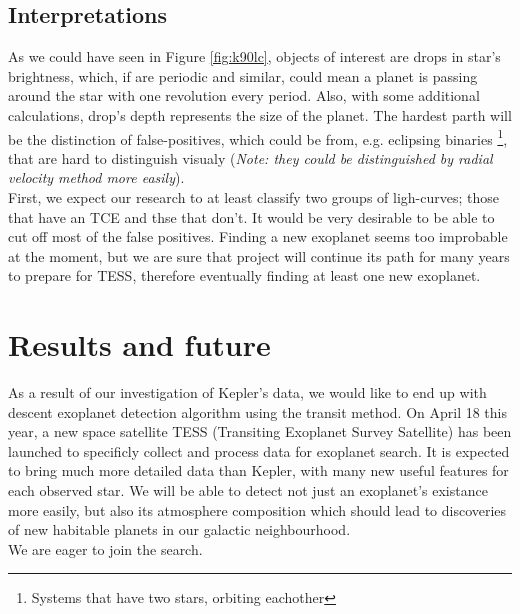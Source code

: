 \documentclass[twoside]{article}
\begin{document}
\begin{multicols}{2}
\subsection{Interpretations}
As we could have seen in Figure \ref{fig:k90lc}, objects of interest are drops in star's brightness, which, if are periodic and similar, could mean a planet is passing around the star with one revolution every period. Also, with some additional calculations, drop's depth represents the size of the planet. The hardest parth will be the distinction of false-positives, which could be from, e.g. eclipsing binaries \footnote{Systems that have two stars, orbiting eachother}, that are hard to distinguish visualy (\textit{Note: they could be distinguished by radial velocity method more easily}).\\
First, we expect our research to at least classify two groups of ligh-curves; those that have an TCE and thse that don't. It would be very desirable to be able to cut off most of the false positives. Finding a new exoplanet seems too improbable at the moment, but we are sure that project will continue its path for many years to prepare for TESS, therefore eventually finding at least one new exoplanet.



\section{Results and future}
As a result of our investigation of Kepler's data, we would like to end up with descent exoplanet detection algorithm using the transit method.
On April 18 this year, a new space satellite TESS (Transiting Exoplanet Survey Satellite) has been launched to specificly collect and process data for exoplanet search. It is expected to bring much more detailed data than Kepler, with many new useful features for each observed star. We will be able to detect not just an exoplanet's existance more easily, but also its atmosphere composition which should lead to discoveries of new habitable planets in our galactic neighbourhood.\\
We are eager to join the search.



\begin{thebibliography}{99}


\end{thebibliography}
\end{multicols}
\end{document}
